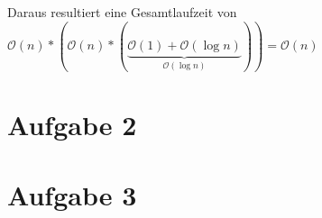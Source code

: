 \documentclass[a4paper]{article}
\begin{document}
 Daraus resultiert eine Gesamtlaufzeit von $\mathcal{O}(n) * (\mathcal{O}(n) * (\underbrace{\mathcal{O}(1) + \mathcal{O}(\log n)}_{\mathcal{O}(\log n)})) = \mathcal{O}(n)$



\section*{Aufgabe 2}
\section*{Aufgabe 3}
\end{document}

